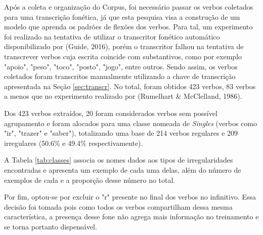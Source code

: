 Após a coleta e organização do Corpus, foi necessário passar os verbos coletados para uma transcrição fonética, já que esta pesquisa visa a construção de um modelo que aprenda os padrões de flexões dos verbos. Para tal, um experimento foi realizado na tentativa de utilizar o transcritor fonético automático disponibilizado por (Guide, 2016)\cite{guide:2016}, porém o transcritor falhou na tentativa de transcrever verbos cuja escrita coincide com substantivos, como por exemplo "apoio", "peso", "toco", "posto", "jogo", entre outros. Sendo assim, os verbos coletados foram transcritos manualmente utilizando a chave de transcrição apresentada na Seção \ref{sec:transcr}. No total, foram obtidos 423 verbos, 83 verbos a menos que no experimento realizado por (Rumelhart \& McClelland, 1986)\cite{rumelhart:1986}.

Dos 423 verbos extraídos, 20 foram considerados verbos sem possível agrupamento e foram alocados para uma classe nomeada de \textit{Singles} (verbos como "ir", "trazer" e "saber"), totalizando uma base de 214 verbos regulares e 209 irregulares (50.6\% e 49.4\% respectivamente). 

A Tabela \ref{tab:classes} associa os nomes dados aos tipos de irregularidades encontradas e apresenta um exemplo de cada uma delas, além do número de exemplos de cada e a proporção desse número no total. 

Por fim, optou-se por excluir o "r" presente no final dos verbos no infinitivo. Essa decisão foi tomada pois como todos os verbos compartilham dessa mesma característica, a presença desse fone não agrega mais informação no treinamento e se torna portanto dispensável.

